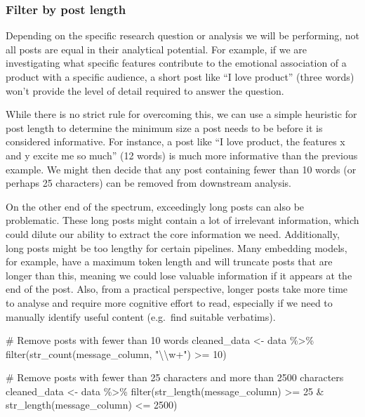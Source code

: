 \documentclass[
  letterpaper,
  DIV=11,
  numbers=noendperiod]{scrreprt}
\newenvironment{Shaded}{\begin{snugshade}}{\end{snugshade}}
\newcommand{\CommentTok}[1]{\textcolor[rgb]{0.37,0.37,0.37}{#1}}
\newcommand{\DecValTok}[1]{\textcolor[rgb]{0.68,0.00,0.00}{#1}}
\newcommand{\FunctionTok}[1]{\textcolor[rgb]{0.28,0.35,0.67}{#1}}
\newcommand{\NormalTok}[1]{\textcolor[rgb]{0.00,0.23,0.31}{#1}}
\newcommand{\OtherTok}[1]{\textcolor[rgb]{0.00,0.23,0.31}{#1}}
\newcommand{\SpecialCharTok}[1]{\textcolor[rgb]{0.37,0.37,0.37}{#1}}
\newcommand{\StringTok}[1]{\textcolor[rgb]{0.13,0.47,0.30}{#1}}
\begin{document}
\subsubsection{Filter by post length}\label{filter-by-post-length}

Depending on the specific research question or analysis we will be
performing, not all posts are equal in their analytical potential. For
example, if we are investigating what specific features contribute to
the emotional association of a product with a specific audience, a short
post like ``I love product'' (three words) won't provide the level of
detail required to answer the question.

While there is no strict rule for overcoming this, we can use a simple
heuristic for post length to determine the minimum size a post needs to
be before it is considered informative. For instance, a post like ``I
love product, the features x and y excite me so much'' (12 words) is
much more informative than the previous example. We might then decide
that any post containing fewer than 10 words (or perhaps 25 characters)
can be removed from downstream analysis.

On the other end of the spectrum, exceedingly long posts can also be
problematic. These long posts might contain a lot of irrelevant
information, which could dilute our ability to extract the core
information we need. Additionally, long posts might be too lengthy for
certain pipelines. Many embedding models, for example, have a maximum
token length and will truncate posts that are longer than this, meaning
we could lose valuable information if it appears at the end of the post.
Also, from a practical perspective, longer posts take more time to
analyse and require more cognitive effort to read, especially if we need
to manually identify useful content (e.g.~find suitable verbatims).

\begin{Shaded}
\begin{Highlighting}[]
\CommentTok{\# Remove posts with fewer than 10 words}
\NormalTok{cleaned\_data }\OtherTok{\textless{}{-}}\NormalTok{ data }\SpecialCharTok{\%\textgreater{}\%} 
  \FunctionTok{filter}\NormalTok{(}\FunctionTok{str\_count}\NormalTok{(message\_column, }\StringTok{"}\SpecialCharTok{\textbackslash{}\textbackslash{}}\StringTok{w+"}\NormalTok{) }\SpecialCharTok{\textgreater{}=} \DecValTok{10}\NormalTok{)}

\CommentTok{\# Remove posts with fewer than 25 characters and more than 2500 characters}
\NormalTok{cleaned\_data }\OtherTok{\textless{}{-}}\NormalTok{ data }\SpecialCharTok{\%\textgreater{}\%} 
  \FunctionTok{filter}\NormalTok{(}\FunctionTok{str\_length}\NormalTok{(message\_column) }\SpecialCharTok{\textgreater{}=} \DecValTok{25} \SpecialCharTok{\&} \FunctionTok{str\_length}\NormalTok{(message\_column) }\SpecialCharTok{\textless{}=} \DecValTok{2500}\NormalTok{)}
\end{Highlighting}
\end{Shaded}
\end{document}
